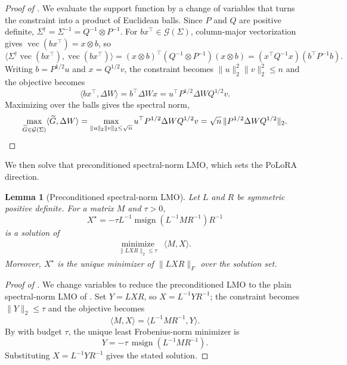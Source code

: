 \documentclass[11pt]{article}
\renewcommand{\vec}{\operatorname{vec}}
\newcommand{\ip}[1]{\langle #1 \rangle}
\DeclareMathOperator{\msign}{msign}          %
\newcommand{\norm}[1]{\| #1\|}
\newcommand{\methodname}{PoLoRA\xspace}
\theoremstyle{plain}
\newtheorem{lemma}{Lemma}
\theoremstyle{definition}
\theoremstyle{remark}
\theoremstyle{definition}
\begin{document}
\begin{proof}[Proof of ]
We evaluate the support function by a change of variables that turns the
constraint into a product of Euclidean balls. Since $P$ and $Q$ are positive
definite, $\Sigma^\dagger=\Sigma^{-1}=Q^{-1}\otimes P^{-1}$. For
$bx^\top\in\mathcal{G}(\Sigma)$, column-major vectorization gives
$\vec(bx^\top)=x\otimes b$, so
\[
\ip{\Sigma^\dagger\vec(bx^\top),\vec(bx^\top)}
=(x\otimes b)^\top(Q^{-1}\otimes P^{-1})(x\otimes b)
=(x^\top Q^{-1}x)(b^\top P^{-1}b).
\]
Writing $b=P^{1/2}u$ and $x=Q^{1/2}v$, the constraint becomes
$\norm{u}_2^2\norm{v}_2^2\leq n$ and the objective becomes
\[
\ip{bx^\top,\Delta W}=b^\top\Delta W x=u^\top P^{1/2}\Delta W Q^{1/2}v .
\]
Maximizing over the balls gives the spectral norm,
\[
\max_{\widetilde{G}\in\mathcal{G}(\Sigma)}\ip{\widetilde{G},\Delta W}
=\max_{\norm{u}_2\norm{v}_2\leq\sqrt{n}}u^\top P^{1/2}\Delta W Q^{1/2}v
=\sqrt{n}\,\norm{P^{1/2}\Delta W Q^{1/2}}_2. \qedhere
\]
\end{proof}

We then solve that preconditioned spectral-norm LMO, which sets the \methodname{} direction.
\begin{lemma}[Preconditioned spectral-norm LMO]
\label{lem:whitened-spectral-lmo}
Let $L$ and $R$ be symmetric positive definite. For a matrix $M$ and $\tau>0$,
\begin{equation}\label{e-gen-spectral-lmo-update}
X^\star = -\tau L^{-1}
\msign\left(L^{-1}MR^{-1}\right) R^{-1}
\end{equation}
is a solution of
\[
\begin{array}{ll}
\underset{\|LXR\|_2\leq\tau}{\mathrm{minimize}}&
\ip{M,X}.
\end{array}
\]
Moreover, $X^\star$ is the unique minimizer of
$\|LXR\|_F$ over the solution set.
\end{lemma}
\begin{proof}[Proof of ]
We change variables to reduce the preconditioned LMO to the plain spectral-norm
LMO of . Set $Y=LXR$, so $X=L^{-1}YR^{-1}$; the constraint
becomes $\norm{Y}_2\le\tau$ and the objective becomes
\[
\ip{M,X}=\ip{L^{-1}MR^{-1},Y} .
\]
By  with budget $\tau$, the unique least Frobenius-norm
minimizer is
\[
    Y=-\tau\,\msign(L^{-1}MR^{-1}).
\]
Substituting $X=L^{-1}YR^{-1}$ gives the stated solution.
\end{proof}
\end{document}
